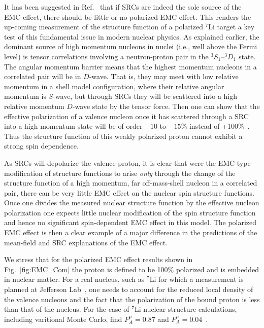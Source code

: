 It has been suggested in Ref.~\cite{Thomas:2018kcx} that if SRCs are indeed the sole source of the EMC effect, there should be little or no polarized EMC effect. This renders the up-coming measurement of the structure function of a polarized $^7$Li target a key test of this fundamental issue in modern nuclear physics. As explained earlier, the dominant source of high momentum nucleons in nuclei (i.e., well above the Fermi level) is tensor correlations involving a neutron-proton pair in the $^3S_1$--$^3D_1$ state. The angular momentum barrier means that the highest momentum nucleons in a correlated pair will be in $D$-wave. That is, they may meet with low relative momentum in a shell model configuration, where their relative angular momentum is $S$-wave, but through SRCs they will be scattered into a high relative momentum $D$-wave state by the tensor force. Then one can show that the effective polarization of a valence nucleon once it has scattered through a SRC into a high momentum state will be of order $-10$ to $-15$\% instead of +100\%~\cite{Thomas:2018kcx}. Thus the structure function of this weakly polarized proton cannot exhibit a strong spin dependence. 

As SRCs will depolarize the valence proton, it is clear that were the EMC-type modification of structure functions to arise {\em only} through the change of the structure function of a high momentum, far off-mass-shell nucleon in a correlated pair, there can be very little EMC effect on the nuclear spin structure functions. Once one divides the measured nuclear structure function by the effective nucleon polarization one expects little nuclear modification of the spin structure function and hence no significant spin-dependent EMC effect in this model. The polarized EMC effect is then a clear example of a major difference in the predictions of the mean-field and SRC explanations of the EMC effect.

We stress that for the polarized EMC effect results shown in Fig.~\ref{fig:EMC_Com} the proton is defined to be 100\% polarized and is embedded in nuclear matter. For a real nucleus, such as $^7$Li for which a measurement is planned at Jefferson Lab~\cite{jlabspin}, one needs to account for the reduced local density of the valence nucleons and the fact that the polarization of the bound proton is less than that of the nucleus. For the case of $^7$Li nuclear structure calculations, including varitional Monte Carlo, find $P_A^p = 0.87$ and $P_A^n = 0.04$~\cite{Pudliner:1997ck}.





